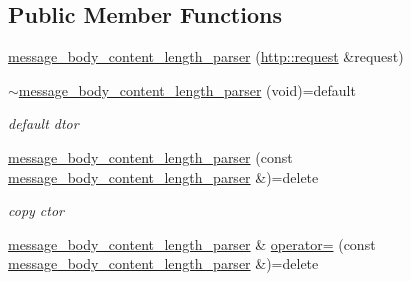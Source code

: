 \subsection*{Public Member Functions}
\begin{DoxyCompactItemize}
\item 
\hyperlink{classnetflex_1_1parsing_1_1message__body__content__length__parser_a639fe3f1644ba35c46cdcb4de6973aee}{message\+\_\+body\+\_\+content\+\_\+length\+\_\+parser} (\hyperlink{classnetflex_1_1http_1_1request}{http\+::request} \&request)
\item 
\mbox{\label{classnetflex_1_1parsing_1_1message__body__content__length__parser_abaa3ebcdf8b246c8a83e92de43cfa1fc}} 
\hyperlink{classnetflex_1_1parsing_1_1message__body__content__length__parser_abaa3ebcdf8b246c8a83e92de43cfa1fc}{$\sim$message\+\_\+body\+\_\+content\+\_\+length\+\_\+parser} (void)=default
\begin{DoxyCompactList}\small\item\em default dtor \end{DoxyCompactList}\item 
\mbox{\label{classnetflex_1_1parsing_1_1message__body__content__length__parser_ab273008d20c057036ea27c81e728f155}} 
\hyperlink{classnetflex_1_1parsing_1_1message__body__content__length__parser_ab273008d20c057036ea27c81e728f155}{message\+\_\+body\+\_\+content\+\_\+length\+\_\+parser} (const \hyperlink{classnetflex_1_1parsing_1_1message__body__content__length__parser}{message\+\_\+body\+\_\+content\+\_\+length\+\_\+parser} \&)=delete
\begin{DoxyCompactList}\small\item\em copy ctor \end{DoxyCompactList}\item 
\mbox{\label{classnetflex_1_1parsing_1_1message__body__content__length__parser_aa186661021a3432bfd349f34398cf5db}} 
\hyperlink{classnetflex_1_1parsing_1_1message__body__content__length__parser}{message\+\_\+body\+\_\+content\+\_\+length\+\_\+parser} \& \hyperlink{classnetflex_1_1parsing_1_1message__body__content__length__parser_aa186661021a3432bfd349f34398cf5db}{operator=} (const \hyperlink{classnetflex_1_1parsing_1_1message__body__content__length__parser}{message\+\_\+body\+\_\+content\+\_\+length\+\_\+parser} \&)=delete

\end{DoxyCompactItemize}
